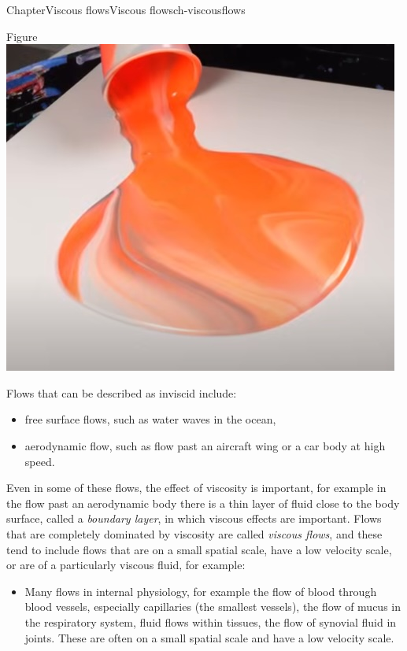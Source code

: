 \documentclass[oneside,10pt,]{book}
\numberwithin{equation}{section}
\begin{document}
\begin{chapterptx}{Chapter}{Viscous flows}{}{Viscous flows}{}{}{ch-viscousflows}
\begin{introduction}{}
\begin{sidebyside}{2}{0}{0}{0}
\begin{sbspanel}{0.5}
\begin{panelfigureptx}{Figure}
\noindent\includegraphics[width=\linewidth]{external/ch-chapter07-J_Mo_Painting-still-from-video-paint-on-surface.jpg}
\tcblower
\end{panelfigureptx}%
\end{sbspanel}%
\end{sidebyside}%
\par
Flows that can be described as inviscid include:%
\begin{itemize}[label=\textbullet]
\item{}free surface flows, such as water waves in the ocean,%
\item{}aerodynamic flow, such as flow past an aircraft wing or a car body at high speed.%
\end{itemize}
Even in some of these flows, the effect of viscosity is important, for example in the flow past an aerodynamic body there is a thin layer of fluid close to the body surface, called a \emph{boundary layer}, in which viscous effects are important. Flows that are completely dominated by viscosity are called \emph{viscous flows}, and these tend to include flows that are on a small spatial scale, have a low velocity scale, or are of a particularly viscous fluid, for example:%
\begin{itemize}[label=\textbullet]
\item{}Many flows in internal physiology, for example the flow of blood through blood vessels, especially capillaries (the smallest vessels), the flow of mucus in the respiratory system, fluid flows within tissues, the flow of synovial fluid in joints. These are often on a small spatial scale and have a low velocity scale.%

\end{itemize}
\end{introduction}
\end{chapterptx}
\end{document}
